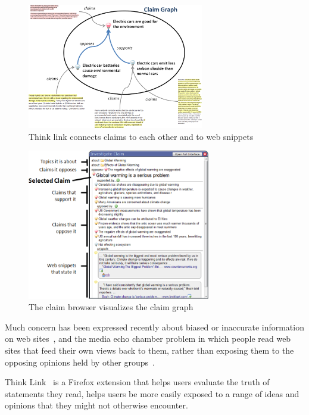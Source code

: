 \documentclass{chi2009}
\begin{document}
\begin{figure}[tb]
	\begin{center}
	\includegraphics[width=7.7cm]{../screenshots/summary_graph.png}
	\caption{Think link connects claims to each other and to web snippets}
	\label{summarygraph}
	\end{center}
\end{figure}

\begin{figure}[tb]
	\begin{center}
	\includegraphics[width=8cm]{../screenshots/claimbrowse_diagram.png}
	\caption{The claim browser visualizes the claim graph}
	\label{claimbrowse_diagram}
	\end{center}
\end{figure}


Much concern has been expressed recently about biased or inaccurate information on web sites~\cite{bbcwebwarning,wikifalse}, and the media echo chamber problem in which people read web sites that feed their own views back to them, rather than exposing them to the opposing opinions held by other groups~\cite{echochamber,echochamber2}. 

Think Link~\cite{thinklink} is a Firefox extension that helps users evaluate the truth of statements they read, helps users be more easily exposed to a range of ideas and opinions that they might not otherwise encounter.
\end{document}
